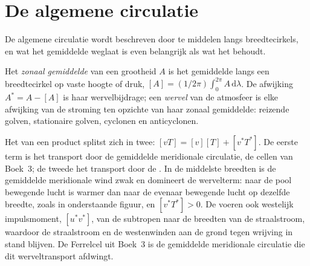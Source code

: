 \section{De algemene circulatie}\label{sec:b3:atmospheric-dynamics:general-circulation}

De algemene circulatie wordt beschreven door te middelen langs breedtecirkels,
en wat het gemiddelde weglaat is even belangrijk als wat het behoudt.

\begin{definition}\label{def:b3:atmospheric-dynamics:eddy}
Het \emph{zonaal gemiddelde} van een grootheid $A$ is het gemiddelde
langs een breedtecirkel op vaste hoogte of druk, $[A] =
(1/2\pi)\int_0^{2\pi} A\,\mathrm d\lambda$. De afwijking $A^* = A - [A]$
is haar wervelbijdrage; een \emph{wervel} van de
atmosfeer is elke afwijking van de stroming ten opzichte van haar zonaal gemiddelde:
reizende golven, stationaire golven, cyclonen en anticyclonen.
\end{definition}

Het  van een product splitst zich in twee: $[vT] = [v][T] + [v^*T^*]$. De
eerste term is het transport door de gemiddelde meridionale circulatie, de cellen
van Boek~3; de tweede het transport door de . In de
middelste breedten is de gemiddelde meridionale wind zwak en domineert de wervelterm:
naar de pool bewegende lucht is warmer dan naar de evenaar bewegende lucht op
dezelfde breedte, zoals in onderstaande figuur, en $[v^*T^*] > 0$. De  voeren
ook westelijk impulsmoment, $[u^*v^*]$, van de subtropen naar de breedten
van de straalstroom, waardoor de straalstroom en de westenwinden aan de grond
tegen wrijving in stand blijven. De Ferrelcel uit Boek~3 is de gemiddelde
meridionale circulatie die dit werveltransport afdwingt.

